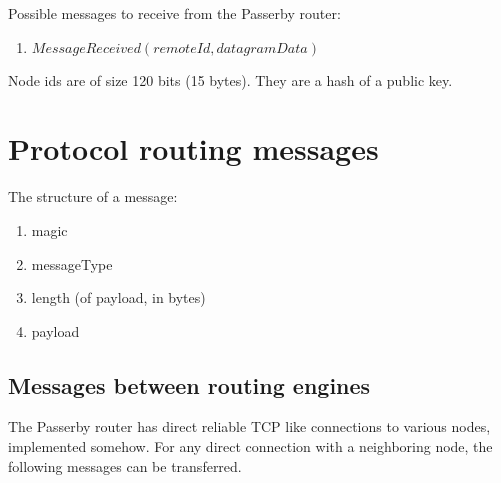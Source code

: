\documentclass{amsart}
\theoremstyle{definition}
\theoremstyle{remark}
\numberwithin{equation}{section}
\begin{document}
Possible messages to receive from the Passerby router:
\begin{enumerate}
  \item $MessageReceived (remoteId, datagramData)$
\end{enumerate}

Node ids are of size 120 bits (15 bytes). They are a hash of a public key.

\section{Protocol routing messages}

The structure of a message:

\begin{enumerate}
  \item magic
  \item messageType
  \item length (of payload, in bytes)
  \item payload
\end{enumerate}

\subsection{Messages between routing engines}

The Passerby router has direct reliable TCP like connections to various nodes,
implemented somehow. For any direct connection with a neighboring node, the
following messages can be transferred.
\end{document}
